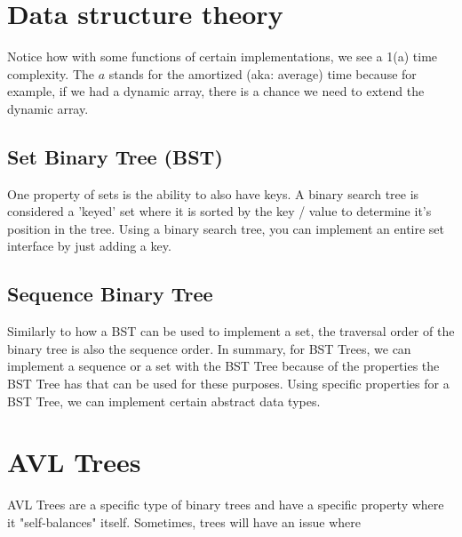 \documentclass[11pt,a4paper,english]{paper}
\begin{document}
\section{Data structure theory}

\bigskip
\noindent Notice how with some functions of certain implementations, we see a 1(a) time complexity. The $a$ stands for the amortized (aka: average) time because for example, if we had a dynamic array, there is a chance we need to extend the dynamic array.

\bigskip
\subsection{Set Binary Tree (BST)} 

One property of sets is the ability to also have keys. A binary search tree is considered a 'keyed' set where it is sorted by the key / value to determine it's position in the tree. Using a binary search tree, you can implement an entire set interface by just adding a key.

\subsection{Sequence Binary Tree}

Similarly to how a BST can be used to implement a set, the traversal order of the binary tree is also the sequence order. In summary, for BST Trees, we can implement a sequence or a set with the BST Tree because of the properties the BST Tree has that can be used for these purposes. Using specific properties for a BST Tree, we can implement certain abstract data types. 

\section{AVL Trees}

AVL Trees are a specific type of binary trees and have a specific property where it "self-balances" itself. Sometimes, trees will have an issue where 
\end{document}
